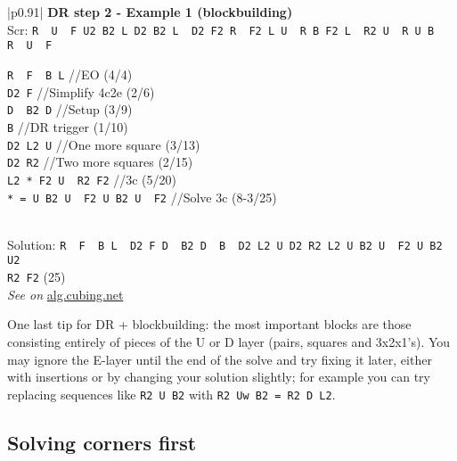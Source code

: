 \documentclass[11pt,a4paper]{book}
\newcommand{\p}{\textquotesingle}
\newcommand{\m}{\texttt}
\newcommand{\ps}{\p\,\,}
\newcommand{\comment}[1]{{\color{gray}\quad//#1}}
\begin{document}
\bigskip
\begin{tabular}{|p{}|}
\hline
\textbf{DR step 2 - Example 1 (blockbuilding)}\\
\hline
Scr: \m{R\ps U\ps F  U2 B2 L  D2 B2 L\ps D2 F2 R\ps F2 L  U\ps R B  F2 L\ps R2 U\ps R  U  B R\ps U\ps F}\\
\hline
\begin{minipage}[l]{0.650\textwidth}
\m{R\ps F\ps B L\p} \comment{EO (4/4)}\\
\m{D2 F} \comment{Simplify 4c2e (2/6)}\\
\m{D\ps B2 D\p} \comment{Setup (3/9)}\\
\m{B\p} \comment{DR trigger (1/10)}\\
\m{D2 L2 U} \comment{One more square (3/13)}\\
\m{D2 R2} \comment{Two more squares (2/15)}\\
\m{L2 * F2 U\ps R2 F2} \comment{3c (5/20)}\\
\m{* = U B2 U\ps F2 U B2 U\ps F2} \comment{Solve 3c (8-3/25)}
\end{minipage}
\begin{minipage}[c]{0.25\textwidth}

\end{minipage}\\
\hline
Solution: \m{R\ps F\ps B L\ps D2 F D\ps B2 D\ps B\ps D2 L2 U D2 R2 L2 U B2 U\ps F2 U B2 U2 }\\ \m{R2 F2} (25)\\
\hline
\emph{See on }\href{https://alg.cubing.net/?setup=R-_U-_F__U2_B2_L__D2_B2_L-_D2_F2_R-_F2_L__U-_R__B__F2_L-_R2_U-_R__U__B__R-_U-_F&alg=R-_F-_B_L-_\%2F\%2FEO_(4\%2F4)\%0AD2_F_\%2F\%2FSimplify_(2\%2F6)\%0AD-_B2_D-_B-_\%2F\%2FDR_(4\%2F10)\%0AD2_L2_U_\%2F\%2FOne_more_square_(3\%2F13)\%0AD2_R2_\%2F\%2FTwo_more_squares_(2\%2F15)\%0AL2_F2_U-_R2_F2_\%2F\%2F3c_(5\%2F25)}{alg.cubing.net}\\
\hline
\end{tabular}
\bigskip


One last tip for DR + blockbuilding: the most important blocks are those consisting entirely of pieces of the U or D layer (pairs, squares and 3x2x1's). You may ignore the E-layer until the end of the solve and try fixing it later, either with insertions or by changing your solution slightly; for example you can try replacing sequences like \m{R2 U B2} with \m{R2 Uw B2 = R2 D L2}. 

\subsection{Solving corners first}
\end{document}
